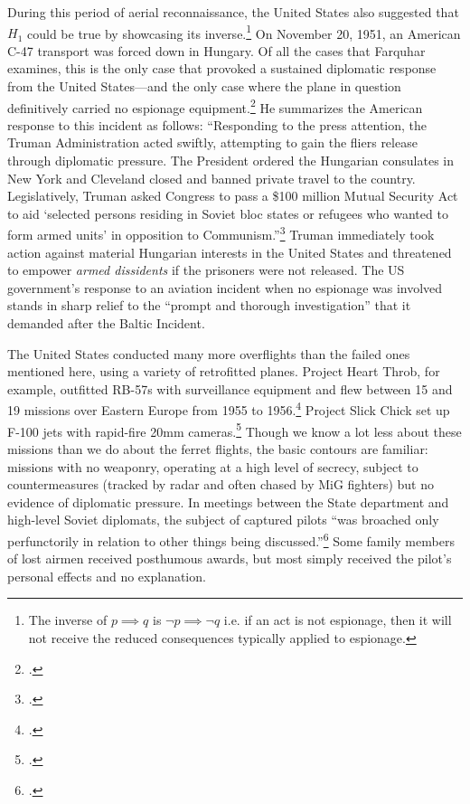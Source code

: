 \documentclass[12pt]{extarticle}
\begin{document}
During this period of aerial reconnaissance, the United States also suggested that $H_1$ could be true by showcasing its inverse.\footnote{The inverse of $p \implies q$ is $\neg p \implies \neg q$ i.e. if an act is not espionage, then it will not receive the reduced consequences typically applied to espionage.} On November 20, 1951, an American C-47 transport was forced down in Hungary. Of all the cases that Farquhar examines, this is the only case that provoked a sustained diplomatic response from the United States---and the only case where the plane in question definitively carried no espionage equipment.\footcite[While the ferret flights were perfectly calibrated to fit as much radio surveillance equipment as possible, the only evidence of espionage that the Soviets were able to produce from the C-47---a plane that they recovered intact---was a portable radio, two extra parachutes, and some packets of warm blankets. Because it was not a ferret flight, the C-47 is omitted from the Peterson list as well.]{the_united_press_soviet_1951} He summarizes the American response to this incident as follows: \enquote{Responding to the press attention, the Truman Administration acted swiftly, attempting to gain the fliers release through diplomatic pressure. The President ordered the Hungarian consulates in New York and Cleveland closed and banned private travel to the country. Legislatively, Truman asked Congress to pass a \$100 million Mutual Security Act to aid \enquote{selected persons residing in Soviet bloc states or refugees who wanted to form armed units} in opposition to Communism.}\footcite[43]{farquhar_aerial_2015} Truman immediately took action against material Hungarian interests in the United States and threatened to empower \emph{armed dissidents} if the prisoners were not released. The US government's response to an aviation incident when no espionage was involved stands in sharp relief to the \enquote{prompt and thorough investigation} that it demanded after the Baltic Incident.

The United States conducted many more overflights than the failed ones mentioned here, using a variety of retrofitted planes. Project Heart Throb, for example, outfitted RB-57s with surveillance equipment and flew between 15 and 19 missions over Eastern Europe from 1955 to 1956.\footcite[194. Based on the recollection of Gerald E. Cooke, a Air Force pilot assigned to the project.]{hall_early_2003} Project Slick Chick set up F-100 jets with rapid-fire 20mm cameras.\footcite[176]{hall_early_2003} Though we know a lot less about these missions than we do about the ferret flights, the basic contours are familiar: missions with no weaponry, operating at a high level of secrecy, subject to countermeasures (tracked by radar and often chased by MiG fighters) but no evidence of diplomatic pressure. In meetings between the State department and high-level Soviet diplomats, the subject of captured pilots \enquote{was broached only perfunctorily in relation to other things being discussed.}\footcite[72]{brugioni_eyes_2010} Some family members of lost airmen received posthumous awards, but most simply received the pilot's personal effects and no explanation.
\end{document}
